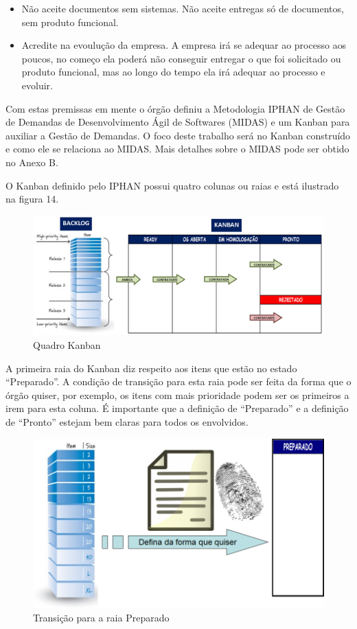 \begin{itemize}
\item Não aceite documentos sem sistemas. Não aceite entregas só de documentos, sem produto funcional.
\item Acredite na evoulução da empresa. A empresa irá se adequar ao processo aos poucos, no começo ela poderá não conseguir entregar o que foi solicitado ou produto funcional, mas ao longo do tempo ela irá adequar ao processo e evoluir. 
\end{itemize} 

Com estas premissas em mente o órgão definiu a Metodologia IPHAN de Gestão de Demandas de Desenvolvimento Ágil de Softwares (MIDAS) e um Kanban para auxiliar a Gestão de Demandas. O foco deste trabalho será no Kanban construído e como ele se relaciona ao MIDAS. Mais detalhes sobre o MIDAS pode ser obtido no Anexo B. 

O Kanban definido pelo IPHAN possui quatro colunas ou raias e está ilustrado na figura 14.

\begin{figure}[h]
		\centering
		\label{fig05}
			\includegraphics[scale=0.5]{figuras/kanbanIPHAN1.png}
		\caption{Quadro Kanban  \cite{parente}}
\end{figure}

A primeira raia do Kanban diz respeito aos itens que estão no estado “Preparado”. A condição de transição para esta raia pode ser feita da forma que o órgão quiser, por exemplo, os itens com mais prioridade podem ser os primeiros a irem para esta coluna. É importante que a definição de “Preparado” e a definição de “Pronto” estejam bem claras para todos os envolvidos.  

\begin{figure}[h]
		\centering
		\label{fig06}
			\includegraphics[scale=0.5]{figuras/kanbanIPHAN2.png}
		\caption{Transição para a raia Preparado \cite{parente}}
\end{figure}

